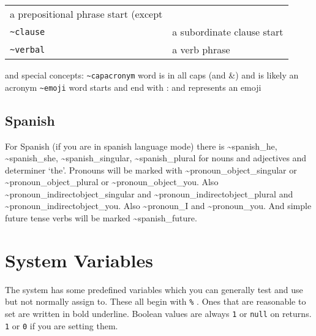 \documentclass[]{article}
\begin{document}
\begin{longtable}[]{@{}ll@{}}
\begin{minipage}[t]{0.20\columnwidth}
a prepositional phrase start (except\strut
\end{minipage}\tabularnewline
\begin{minipage}[t]{0.30\columnwidth}\raggedright\strut
\texttt{\textasciitilde{}clause}\strut
\end{minipage} & \begin{minipage}[t]{0.20\columnwidth}\raggedright\strut
a subordinate clause start\strut
\end{minipage}\tabularnewline
\begin{minipage}[t]{0.30\columnwidth}\raggedright\strut
\texttt{\textasciitilde{}verbal}\strut
\end{minipage} & \begin{minipage}[t]{0.20\columnwidth}\raggedright\strut
a verb phrase\strut
\end{minipage}\tabularnewline
\bottomrule
\end{longtable}

and special concepts: \textbar{} \texttt{\textasciitilde{}capacronym}
\textbar{} word is in all caps (and \&) and is likely an acronym
\textbar{} \texttt{\textasciitilde{}emoji} \textbar{} word starts and
end with : and represents an emoji

\subsection{Spanish}\label{spanish}

For Spanish (if you are in spanish language mode) there is
\textasciitilde{}spanish\_he, \textasciitilde{}spanish\_she,
\textasciitilde{}spanish\_singular, \textasciitilde{}spanish\_plural for
nouns and adjectives and determiner `the'. Pronouns will be marked with
\textasciitilde{}pronoun\_object\_singular or
\textasciitilde{}pronoun\_object\_plural or
\textasciitilde{}pronoun\_object\_you. Also
\textasciitilde{}pronoun\_indirectobject\_singular and
\textasciitilde{}pronoun\_indirectobject\_plural and
\textasciitilde{}pronoun\_indirectobject\_you. Also
\textasciitilde{}pronoun\_I and \textasciitilde{}pronoun\_you. And
simple future tense verbs will be marked
\textasciitilde{}spanish\_future.

\section{System Variables}\label{system-variables}

The system has some predefined variables which you can generally test
and use but not normally assign to. These all begin with \texttt{\%} .
Ones that are reasonable to set are written in bold underline. Boolean
values are always \texttt{1} or \texttt{null} on returns. \texttt{1} or
\texttt{0} if you are setting them.
\end{document}
